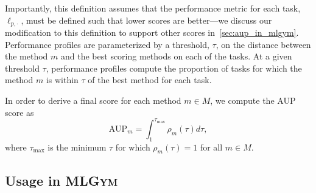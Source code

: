 \documentclass[]{fairmeta}
\newcommand{\dm}[1]{\colorbox{Emerald}{\textcolor{white}{Despoina}}\textcolor{Emerald}{\textbf{:#1}}}
\newcommand{\mlgym}{\fontfamily{lmr}\selectfont\mdseries\textsc{MLGym}\xspace}
\begin{document}

%
Importantly, this definition assumes that the performance metric for each task, $\ell_{p,\cdot}$, must be defined such that lower scores are better---we discuss our modification to this definition to support other scores in~\autoref{sec:aup_in_mlgym}. 
%
Performance profiles are parameterized by a threshold, $\tau$, on the distance between the method $m$ and the best scoring methods on each of the tasks. 
%
At a given threshold $\tau$, performance profiles compute the proportion of tasks for which the method $m$ is within $\tau$ of the best method for each task. 

In order to derive a final score for each method $m \in M$, we compute the AUP score as
\begin{equation}
    \text{AUP}_m = \int_{1}^{\tau_\text{max}} \rho_{m}(\tau) d{\tau},
\end{equation}
where $\tau_\text{max}$ is the minimum $\tau$ for which $\rho_{m}(\tau) = 1$ for all $m \in M$.  



%




\subsection{Usage in \mlgym}
\label{sec:aup_in_mlgym}
\end{document}
